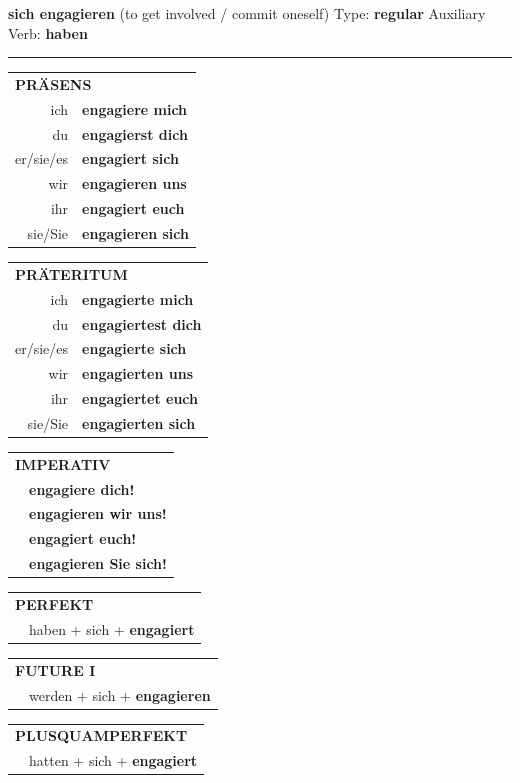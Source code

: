 \documentclass[10pt,a4paper]{revtex4-2}
\begin{document}
\begin{verbbox}
{\Large \bf sich engagieren} (to get involved / commit oneself) \hfill Type: \textbf{regular} \hfill Auxiliary Verb: \textbf{haben}

\vspace{5pt}
\hrule
\vspace{5pt}

\begin{tabular}{rl}
\multicolumn{2}{l}{\textbf{PRÄSENS}}\\
ich & \textbf{engagiere mich}\\
du & \textbf{engagierst dich}\\
er/sie/es & \textbf{engagiert sich}\\
wir & \textbf{engagieren uns}\\
ihr & \textbf{engagiert euch}\\
sie/Sie & \textbf{engagieren sich}\\
\end{tabular}
\hfill
\begin{tabular}{rl}
\multicolumn{2}{l}{\textbf{PRÄTERITUM}}\\
ich & \textbf{engagierte mich}\\
du & \textbf{engagiertest dich}\\
er/sie/es & \textbf{engagierte sich}\\
wir & \textbf{engagierten uns}\\
ihr & \textbf{engagiertet euch}\\
sie/Sie & \textbf{engagierten sich}\\
\end{tabular}
\hfill
\begin{tabular}{rl}
\multicolumn{2}{l}{\textbf{IMPERATIV}}\\
& \textbf{engagiere dich!}\\
& \textbf{engagieren wir uns!}\\
& \textbf{engagiert euch!}\\
& \textbf{engagieren Sie sich!}\\
\end{tabular}

\vspace{10pt}

\begin{tabular}{rl}
\multicolumn{2}{l}{\textbf{PERFEKT}}\\
& haben + sich + \textbf{engagiert}\\
\end{tabular}
\hfill
\begin{tabular}{rl}
\multicolumn{2}{l}{\textbf{FUTURE I}}\\
& werden + sich + \textbf{engagieren}\\
\end{tabular}
\hfill
\begin{tabular}{rl}
\multicolumn{2}{l}{\textbf{PLUSQUAMPERFEKT}}\\
& hatten + sich + \textbf{engagiert}\\
\end{tabular}


\end{verbbox}
\end{document}
